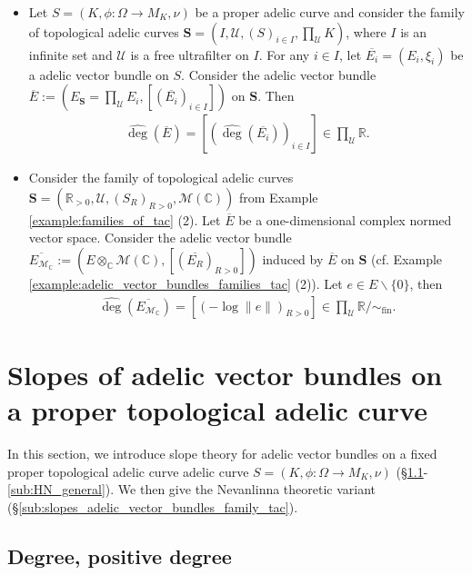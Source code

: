 \documentclass [11pt,reqno]{amsart}
\def\bC{{\mathbb{C}}}
\def\bR{{\mathbb{R}}}
\newcommand{\1}{\mathmybb{1}}
\def\cM{{\mathcal{M}}}
\def\cU{{\mathcal{U}}}
\def\fin{\mathrm{fin}}
\def\setminus{\smallsetminus}
\begin{document}
\begin{example}
\label{example:degree_adelic_vector_bundles_families_tac_Nevanlinna}
\begin{itemize}
	\item[(1)] Let $S=(K,\phi:\Omega\to M_{K},\nu)$ be a proper adelic curve and consider the family of topological adelic curves $\mathbf{S}=(I,\cU,(S)_{i\in I},\prod_{\cU}K)$, where $I$ is an infinite set and $\cU$ is a free ultrafilter on $I$. For any $i\in I$, let $\overline{E_{i}}=(E_{i},\xi_{i})$ be a adelic vector bundle on $S$. Consider the adelic vector bundle $\overline{E}:=(E_{\mathbf{S}}=\prod_{\cU}E_{i},[(\overline{E_{i}})_{i\in I}])$ on $\mathbf{S}$. Then 
	\begin{align*}
	\widehat{\deg}(\overline{E}) = \left[\left(\widehat{\deg}(\overline{E_{i}})\right)_{i\in I}\right] \in \displaystyle\prod_{\cU}\bR.
	\end{align*}
	\item[(2)] Consider the family of topological adelic curves $\mathbf{S}=(\bR_{>0},\cU,(S_{R})_{R>0},\cM(\bC))$ from Example \ref{example:families_of_tac} (2). Let $\overline{E}$ be a one-dimensional complex normed vector space. Consider the adelic vector bundle $\overline{E_{\cM_{\bC}}}:=(E\otimes_{\bC}\cM(\bC),[(\overline{E_{R}})_{R>0}])$ induced by $\overline{E}$ on $\mathbf{S}$ (cf. Example \ref{example:adelic_vector_bundles_families_tac} (2)). Let $e\in E\setminus\{0\}$, then
	\begin{align*}
	\widehat{\deg}(\overline{E_{\cM_{\bC}}}) = \left[\left(-\log\|e\|\right)_{R>0}\right] \in \displaystyle \prod_{\cU}\bR /\sim_{\fin}.
	\end{align*}
\end{itemize}
\end{example}

\section{Slopes of adelic vector bundles on a proper topological adelic curve}
\label{sec:slopes_proper_case}

In this section, we introduce slope theory for adelic vector bundles on a fixed proper topological adelic curve adelic curve $S=(K,\phi : \Omega \to M_{K},\nu)$ (\S \ref{sub:degree_positive_degree}-\ref{sub:HN_general}). We then give the Nevanlinna theoretic variant (\S \ref{sub:slopes_adelic_vector_bundles_family_tac}).

\subsection{Degree, positive degree}
\label{sub:degree_positive_degree}
\end{document}
